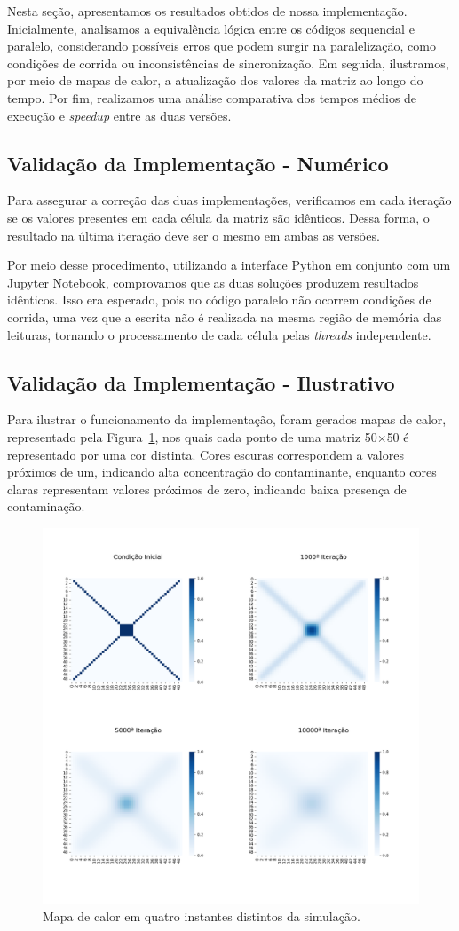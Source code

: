 \documentclass[12pt]{article}
\begin{document}
Nesta seção, apresentamos os resultados obtidos de nossa implementação.
Inicialmente, analisamos a equivalência lógica entre os códigos sequencial e
paralelo, considerando possíveis erros que podem surgir na paralelização, como
condições de corrida ou inconsistências de sincronização. Em seguida,
ilustramos, por meio de mapas de calor, a atualização dos valores da matriz ao
longo do tempo. Por fim, realizamos uma análise comparativa dos tempos médios
de execução e \textit{speedup} entre as duas versões.

\subsection{Validação da Implementação - Numérico}

Para assegurar a correção das duas implementações, verificamos em cada iteração
se os valores presentes em cada célula da matriz são idênticos. Dessa forma, o
resultado na última iteração deve ser o mesmo em ambas as versões.

Por meio desse procedimento, utilizando a interface Python em conjunto com um
Jupyter Notebook, comprovamos que as duas soluções produzem resultados
idênticos. Isso era esperado, pois no código paralelo não ocorrem condições de
corrida, uma vez que a escrita não é realizada na mesma região de memória das
leituras, tornando o processamento de cada célula pelas \textit{threads}
independente.

\subsection{Validação da Implementação - Ilustrativo}

Para ilustrar o funcionamento da implementação, foram gerados mapas de calor,
representado pela Figura~\ref{fig:heatmap}, nos quais cada ponto de uma matriz
50$\times$50 é representado por uma cor distinta. Cores escuras correspondem a
valores próximos de um, indicando alta concentração do contaminante, enquanto
cores claras representam valores próximos de zero, indicando baixa presença de
contaminação.

\begin{figure}[ht]
  \centering
  \includegraphics[width=.45\textwidth]{figs/heatmap.png}
  \caption{Mapa de calor em quatro instantes distintos da simulação.}\label{fig:heatmap}
\end{figure}
\end{document}
